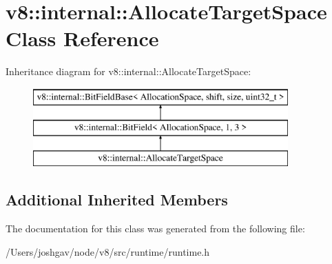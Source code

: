 \hypertarget{classv8_1_1internal_1_1_allocate_target_space}{}\section{v8\+:\+:internal\+:\+:Allocate\+Target\+Space Class Reference}
\label{classv8_1_1internal_1_1_allocate_target_space}
Inheritance diagram for v8\+:\+:internal\+:\+:Allocate\+Target\+Space\+:\begin{figure}[H]
\begin{center}
\leavevmode
\includegraphics[height=3.000000cm]{classv8_1_1internal_1_1_allocate_target_space}
\end{center}
\end{figure}
\subsection*{Additional Inherited Members}


The documentation for this class was generated from the following file\+:\begin{DoxyCompactItemize}
\item 
/\+Users/joshgav/node/v8/src/runtime/runtime.\+h\end{DoxyCompactItemize}
